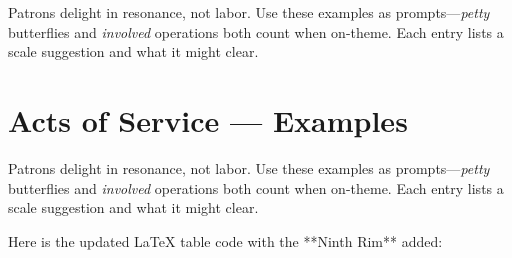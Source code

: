 Patrons delight in resonance, not labor. Use these examples as prompts—\emph{petty} butterflies and \emph{involved} operations both count when on-theme. Each entry lists a scale suggestion and what it might clear.


\section{Acts of Service — Examples}\label{sec:acts-of-service-table}

Patrons delight in resonance, not labor. Use these examples as prompts---\emph{petty} butterflies and \emph{involved} operations both count when on-theme. Each entry lists a scale suggestion and what it might clear.

Here is the updated LaTeX table code with the **Ninth Rim** added:

